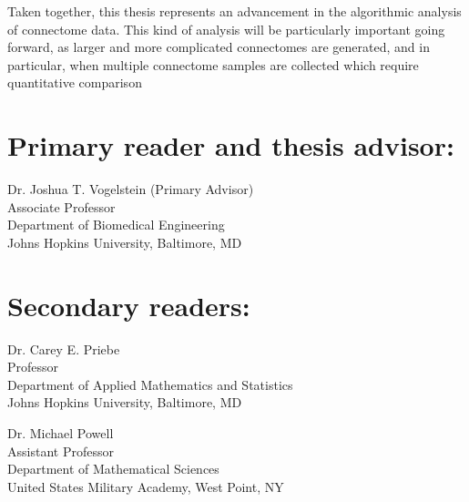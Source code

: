 Taken together, this thesis represents an advancement in the algorithmic analysis
of connectome data. This kind of analysis will be particularly important going forward,
as larger and more complicated connectomes are generated, and in particular, when
multiple connectome samples are collected which require quantitative comparison



\begin{singlespace}

\section*{Primary reader and thesis advisor:}

Dr. Joshua T. Vogelstein (Primary Advisor)\\
Associate Professor \\
Department of Biomedical Engineering\\
Johns Hopkins University, Baltimore, MD 


\section*{Secondary readers:}

Dr. Carey E. Priebe \\
Professor \\
Department of Applied Mathematics and Statistics\\
Johns Hopkins University, Baltimore, MD 

\vspace{0.1in}

Dr. Michael Powell \\
Assistant Professor \\
Department of Mathematical Sciences\\
United States Military Academy, West Point, NY


\end{singlespace}